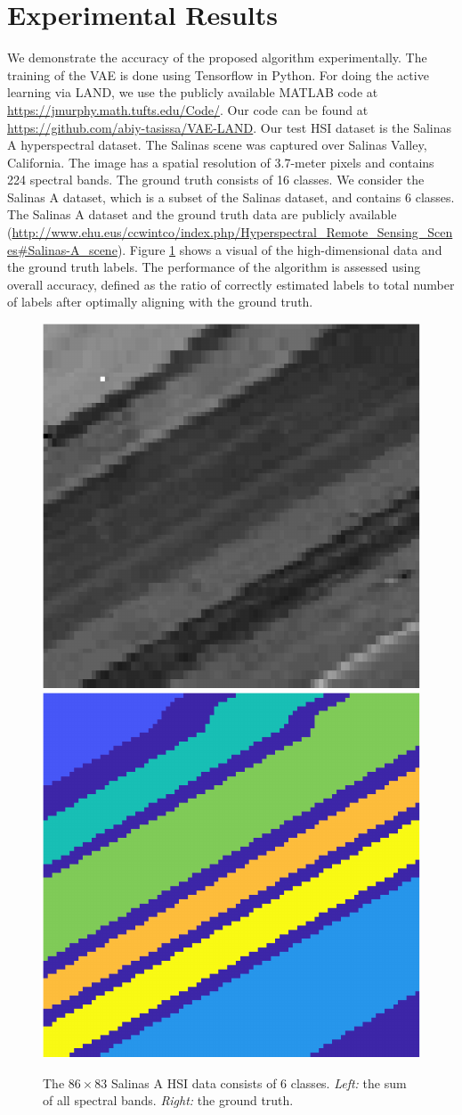 \documentclass{article}
\begin{document}
\section{Experimental Results}
\label{sec:Experiments}
We demonstrate the accuracy of the proposed algorithm experimentally.  The training of the VAE is done using Tensorflow in Python. For doing the active learning via LAND, we use the publicly available MATLAB code 
at  \url{https://jmurphy.math.tufts.edu/Code/}. Our code can be found at \url{https://github.com/abiy-tasissa/VAE-LAND}. Our test HSI dataset is the Salinas A hyperspectral dataset. The Salinas scene was captured over Salinas Valley, California. The image has a spatial resolution of 3.7-meter pixels and contains 224 spectral bands. The ground truth consists of 16 classes. We consider the Salinas A dataset, which is a subset of the Salinas dataset, and contains 6 classes. The Salinas A dataset and the ground truth data are publicly available (\url{http://www.ehu.eus/ccwintco/index.php/Hyperspectral_Remote_Sensing_Scenes#Salinas-A_scene}). Figure \ref{fig:SalinasA} shows a visual of the high-dimensional data and the ground truth labels. The performance of the algorithm is assessed using overall accuracy, defined as the ratio of correctly estimated labels to total number of labels after optimally aligning with the ground truth. 
\begin{figure}[h]
\centering
\includegraphics[width=.23\textwidth,clip]{Images/SalinasA_BandSum-crop.pdf}
\includegraphics[width=.23\textwidth,clip]{Images/SalinasA_GT-crop.pdf}
\caption{\small{The $86\times 83$ Salinas A HSI data consists of 6 classes.  \emph{Left:} the sum of all spectral bands.  \emph{Right:} the ground truth.}}
\label{fig:SalinasA}
\end{figure}
\end{document}

